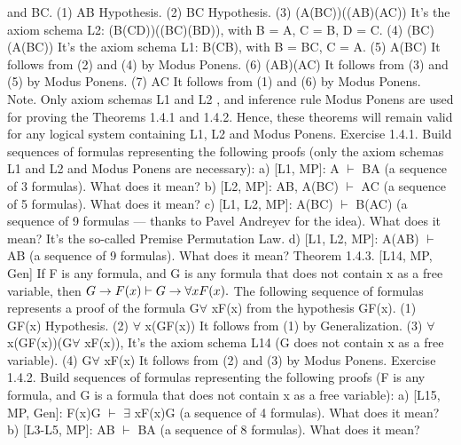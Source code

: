 and B\IMPLIES C.
(1) A\IMPLIES B
Hypothesis.
(2) B\IMPLIES C Hypothesis.
(3) (A\IMPLIES (B\IMPLIES C))\IMPLIES ((A\IMPLIES B)\IMPLIES (A\IMPLIES C)) It's the axiom schema L2:
                                       (B\IMPLIES (C\IMPLIES D))\IMPLIES ((B\IMPLIES C)\IMPLIES (B\IMPLIES D)), with B =
                                                  A, C = B, D = C.
(4) (B\IMPLIES C)\IMPLIES (A\IMPLIES (B\IMPLIES C)) It's the axiom schema L1: B\IMPLIES (C\IMPLIES B), with B
                               = B\IMPLIES C, C = A.
(5) A\IMPLIES (B\IMPLIES C) It follows from (2) and (4) by Modus Ponens.
(6) (A\IMPLIES B)\IMPLIES (A\IMPLIES C) It follows from (3) and (5) by Modus Ponens.
(7) A\IMPLIES C It follows from (1) and (6) by Modus Ponens.
Note. Only axiom schemas L1 and L2 , and inference rule Modus Ponens are used for proving the
Theorems 1.4.1 and 1.4.2. Hence, these theorems will remain valid for any logical system containing
L1, L2 and Modus Ponens.
Exercise 1.4.1. Build sequences of formulas representing the following proofs (only the axiom schemas
L1 and L2 and Modus Ponens are necessary):
a) [L1, MP]: A \(\vdash\) B\IMPLIES A (a sequence of 3 formulas). What does it mean?
b) [L2, MP]: A\IMPLIES B, A\IMPLIES (B\IMPLIES C) \(\vdash\) A\IMPLIES C (a sequence of 5 formulas). What does it mean?
c) [L1, L2, MP]: A\IMPLIES (B\IMPLIES C) \(\vdash\) B\IMPLIES (A\IMPLIES C) (a sequence of 9 formulas --- thanks to Pavel Andreyev for the
idea). What does it mean? It's the so-called Premise Permutation Law.
d) [L1, L2, MP]: A\IMPLIES (A\IMPLIES B) \(\vdash\) A\IMPLIES B (a sequence of 9 formulas). What does it mean?
Theorem 1.4.3. [L14, MP, Gen] If F is any formula, and G is any formula that does not contain x as a free
variable, then
\(G\rightarrow F(x) \vdash G\rightarrow \forall xF(x).\)
The following sequence of formulas represents a proof of the formula G\IMPLIES \(\forall\) xF(x) from the hypothesis
G\IMPLIES F(x).
(1) G\IMPLIES F(x) Hypothesis.
(2) \(\forall\) x(G\IMPLIES F(x)) It follows from (1) by Generalization.
(3) \(\forall\) x(G\IMPLIES F(x))\IMPLIES (G\IMPLIES \(\forall\) xF(x)), It's the axiom schema L14 (G does not contain x as a free variable).
(4) G\IMPLIES \(\forall\) xF(x) It follows from (2) and (3) by Modus Ponens.
Exercise 1.4.2. Build sequences of formulas representing the following proofs (F is any formula, and G is
a formula that does not contain x as a free variable):
a) [L15, MP, Gen]: F(x)\IMPLIES G \(\vdash\) \(\exists\) xF(x)\IMPLIES G (a sequence of 4 formulas). What does it mean?
b) [L3-L5, MP]: A\AND B \(\vdash\) B\AND A (a sequence of 8 formulas). What does it mean?
